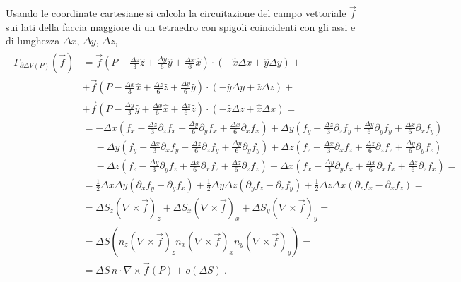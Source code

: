 \documentclass[letterpaper,10pt,italian]{jupyterBook}
\begin{document}
\sphinxAtStartPar
Usando le coordinate cartesiane si calcola la circuitazione del campo vettoriale \(\vec{f}\) sui lati della faccia maggiore di un tetraedro con spigoli coincidenti con gli assi e di lunghezza \(\Delta x\), \(\Delta y\), \(\Delta z\),
\begin{equation*}
\begin{split}\begin{aligned}
  \Gamma_{\partial \Delta V(P)}\left(\vec{f}\right) 
  & = \vec{f}\left( P - \frac{\Delta z}{3} \hat{z} + \frac{\Delta y}{6} \hat{y} + \frac{\Delta x}{6} \hat{x} \right) \cdot \left( - \hat{x} \Delta x + \hat{y} \Delta y \right) + \\
  & + \vec{f}\left( P - \frac{\Delta x}{3} \hat{x} + \frac{\Delta z}{6} \hat{z} + \frac{\Delta y}{6} \hat{y} \right) \cdot \left( - \hat{y} \Delta y + \hat{z} \Delta z \right) + \\
  & + \vec{f}\left( P - \frac{\Delta y}{3} \hat{y} + \frac{\Delta x}{6} \hat{x} + \frac{\Delta z}{6} \hat{z} \right) \cdot \left( - \hat{z} \Delta z + \hat{x} \Delta x \right) = \\
  & =       - \Delta x \left( f_x - \frac{\Delta z}{3} \partial_z f_x + \frac{\Delta y}{6} \partial_y f_x + \frac{\Delta x}{6} \partial_x f_x \right)
            + \Delta y \left( f_y - \frac{\Delta z}{3} \partial_z f_y + \frac{\Delta y}{6} \partial_y f_y + \frac{\Delta x}{6} \partial_x f_y \right) \\
  & \ \quad - \Delta y \left( f_y - \frac{\Delta x}{3} \partial_x f_y + \frac{\Delta z}{6} \partial_z f_y + \frac{\Delta y}{6} \partial_y f_y \right)
            + \Delta z \left( f_z - \frac{\Delta x}{3} \partial_x f_z + \frac{\Delta z}{6} \partial_z f_z + \frac{\Delta y}{6} \partial_y f_z \right) \\
  & \ \quad - \Delta z \left( f_z - \frac{\Delta y}{3} \partial_y f_z + \frac{\Delta x}{6} \partial_x f_z + \frac{\Delta z}{6} \partial_z f_z \right)
            + \Delta x \left( f_x - \frac{\Delta y}{3} \partial_y f_x + \frac{\Delta x}{6} \partial_x f_x + \frac{\Delta z}{6} \partial_z f_x \right) = \\
  & = \frac{1}{2} \Delta x \Delta y \left( \partial_x f_y - \partial_y f_x \right)
    + \frac{1}{2} \Delta y \Delta z \left( \partial_y f_z - \partial_z f_y \right)
    + \frac{1}{2} \Delta z \Delta x \left( \partial_z f_x - \partial_x f_z \right) = \\
  & = \Delta S_z \left( \nabla \times \vec{f} \right)_z
    + \Delta S_x \left( \nabla \times \vec{f} \right)_x
    + \Delta S_y \left( \nabla \times \vec{f} \right)_y = \\
  & = \Delta S \left(
             n_z \left( \nabla \times \vec{f} \right)_z
             n_x \left( \nabla \times \vec{f} \right)_x
             n_y \left( \nabla \times \vec{f} \right)_y 
  \right) = \\
  & = \Delta S \, \hat{n} \cdot \nabla \times \vec{f}(P) + o(\Delta S) \ .
\end{aligned}\end{split}
\end{equation*}
\end{document}
